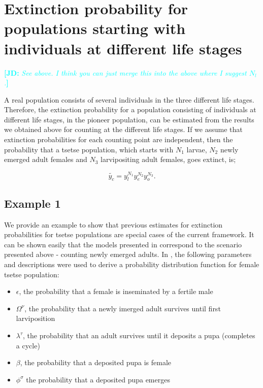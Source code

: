 \documentclass[smallextended]{svjour3}
\newcommand{\comment}[3]{\textcolor{#1}{\textbf{[#2: }\textit{#3}\textbf{]}}}
\newcommand{\jd}[1]{\comment{cyan}{JD}{#1}}
\newcommand{\eb}[1]{\comment{blue}{EB}{#1}}
\begin{document}
\section{Extinction probability for  populations starting with individuals at different life stages}


\jd{See above. I think you can just merge this into the above where I suggest $N_l$.}

A real population consists of several individuals in the three different life stages. Therefore, the  extinction probability for a population consisting of individuals at different life stages, in the pioneer population, can be estimated  from the results we obtained above for  counting at the different life stages.  If we assume that extinction probabilities for each counting point are independent, then the probability that a tsetse population, which starts with $N_1$ larvae, $N_2$ newly emerged adult females and $N_3$ larvipositing adult females, goes extinct, is; 

$$\tilde{y_c} = y_{l}^{N_1}y_{e}^{N_2}y_{o}^{N_3}.$$ 

\subsection{Example 1}

We provide an example to show that previous estimates for extinction probabilities for tsetse populations are special cases of the current framework. It can be shown easily that the models presented in \cite{Hargrove2005a,Kajunguri2019,Are2019} correspond to the scenario presented above - counting newly emerged adults. In \cite{Are2019}, the following parameters and descriptions were used to derive a probability distribution function for female tsetse population: 
\begin{itemize}
	\item $\epsilon$, the probability that a female is inseminated by a fertile male 
	\item $\Omega^{\nu}$,  the probability that a newly imerged adult survives until first larviposition
	\item $ \lambda^{\tau}$, the probability that an adult survives until it deposits a pupa (completes a cycle)
	\item $\beta$,  the probability that a deposited pupa is female 
	\item $\phi^{\sigma}$  the probability that a deposited pupa emerges
\end{itemize}
\end{document}
